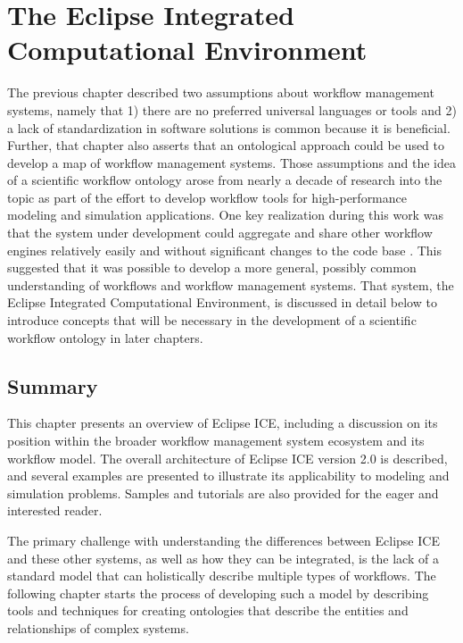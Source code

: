 \chapter{The Eclipse Integrated Computational Environment} \label{ch:eclipse-ice}

The previous chapter described two assumptions about workflow management
systems, namely that 1) there are no preferred universal languages or tools
and 2) a lack of standardization in software solutions is common because it is
beneficial. Further, that chapter also asserts that an ontological approach
could be used to develop a map of workflow management systems. Those assumptions
and the idea of a scientific workflow ontology arose from nearly a decade of
research into the topic as part of the effort to develop workflow tools for
high-performance modeling and simulation applications. One key realization
during this work was that the system under development could aggregate and share
other workflow engines relatively easily and without significant changes to the
code base \cite{brooks_introducing_2016}. This suggested that it was possible
to develop a more general, possibly common understanding of workflows and
workflow management systems. That system, the Eclipse Integrated Computational
Environment, is discussed in detail below to introduce concepts that will be
necessary in the development of a scientific workflow ontology in later
chapters.


\section{Summary}

This chapter presents an overview of Eclipse ICE, including a discussion on its
position within the broader workflow management system ecosystem and its
workflow model. The overall architecture of Eclipse ICE version 2.0 is
described, and several examples are presented to illustrate its applicability
to modeling and simulation problems. Samples and tutorials are also provided
for the eager and interested reader.


The primary challenge with understanding the differences between Eclipse ICE and
these other systems, as well as how they can be integrated, is the lack of a
standard model that can holistically describe multiple types of workflows. The
following chapter starts the process of developing such a model by
describing tools and techniques for creating ontologies that describe the
entities and relationships of complex systems.
